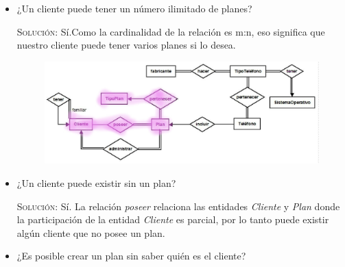 \documentclass[letterpaper,11pt]{article}
\begin{document}
    \begin{itemize}
        \item ¿Un cliente puede tener un número ilimitado de planes?


    \textsc{Solución:} Sí.Como la cardinalidad de la relación es m:n, eso significa que nuestro cliente puede tener varios planes si lo desea.

    \begin{figure}[h]
        \centering
        \includegraphics[scale=0.4]{./imagenes/modelo1.jpg}
    \end{figure}

    \item ¿Un cliente puede existir sin un plan?


    \textsc{Solución:} Sí. La relación \textit{poseer} relaciona las entidades \textit{Cliente} y \textit{Plan} donde la participación de la entidad \textit{Cliente} es parcial, por lo tanto puede existir algún cliente que no posee un plan.


    \item ¿Es posible crear un plan sin saber quién es el cliente?


\end{itemize}
\end{document}

